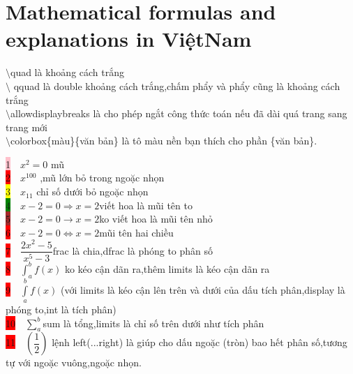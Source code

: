 \documentclass{article}
\begin{document}
\Large\section{Mathematical formulas and explanations in ViệtNam}
\large $\setminus$quad là khoảng cách trắng\\

$\setminus$ qquad là double khoảng cách trắng,chấm phẩy và phẩy cũng là khoảng cách trắng\\

$\setminus$allowdisplaybreaks là cho phép ngắt công thức toán nếu đã dài quá trang sang trang mới\\

$\setminus$colorbox\{màu\}\{văn bản\} là tô màu nền bạn thích cho phần \{văn bản\}.

\colorbox{pink}{1}$\quad x^2=0$  \quad     mũ\\

\colorbox{red}{2}$\quad x^{100}$ \quad ,mũ lớn bỏ trong ngoặc nhọn\\

\colorbox{yellow}{3}$\quad x_{11}$ \quad chỉ số dưới bỏ ngoặc nhọn\\

\colorbox{green}{4}$\quad  x-2=0 \Rightarrow x=2 $\quad viết hoa là mũi tên to\\

\colorbox{brown}{5}$\quad x-2=0 \rightarrow x=2  $\quad  ko viết hoa là mũi tên nhỏ\\

\colorbox{red}{6}$\quad x-2=0 \Leftrightarrow x=2 $\quad mũi tên hai chiều\\

\colorbox{red}{7}$\quad\dfrac{2x^2-5}{x^5-3}$\quad frac là chia,dfrac là phóng to phân số\\

\colorbox{red}{8}$\quad \displaystyle\int_a^bf(x)$ \quad ko kéo cận dãn ra,thêm limits là kéo cận dãn ra\\

\colorbox{red}{9}$\quad\displaystyle\int\limits_a^bf(x)$ (với limits là kéo cận lên trên và dưới của dấu tích phân,display là phóng to,int là tích phân)\\

\colorbox{red}{10}$\quad\displaystyle\sum\limits_a^b$\quad sum là tổng,limits là chỉ số trên dưới như tích phân\\

\colorbox{red}{11}$\quad\left(\dfrac{1}{2}\right)$ \quad lệnh left(...right) là giúp cho dấu ngoặc (tròn) bao hết phân số,tương tự với ngoặc vuông,ngoặc nhọn.\\
\end{document}
